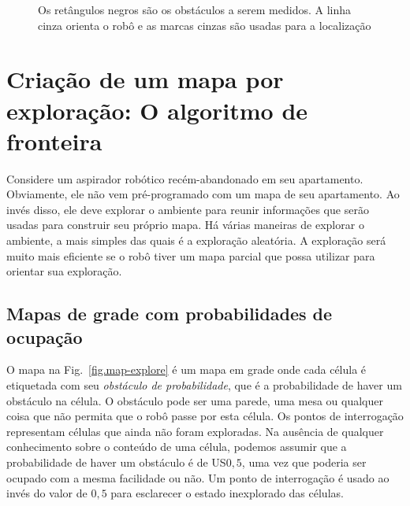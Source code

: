 \begin{figure}
\begin{center}
\end{center}
\caption{Os retângulos negros são os obstáculos a serem medidos. A linha cinza orienta o robô e as marcas cinzas são usadas para a localização}\label{fig.mapping-activity}
\end{figure}

\section{Criação de um mapa por exploração: O algoritmo de fronteira}\label{s.map-create}

Considere um aspirador robótico recém-abandonado em seu apartamento. Obviamente, ele não vem pré-programado com um mapa de seu apartamento. Ao invés disso, ele deve explorar o ambiente para reunir informações que serão usadas para construir seu próprio mapa. Há várias maneiras de explorar o ambiente, a mais simples das quais é a exploração aleatória. A exploração será muito mais eficiente se o robô tiver um mapa parcial que possa utilizar para orientar sua exploração.

\subsection{Mapas de grade com probabilidades de ocupação}

O mapa na Fig.~\ref{fig.map-explore} é um mapa em grade onde cada célula é etiquetada com seu \emph{obstáculo de probabilidade}, que é a probabilidade de haver um obstáculo na célula. O obstáculo pode ser uma parede, uma mesa ou qualquer coisa que não permita que o robô passe por esta célula. Os pontos de interrogação representam células que ainda não foram exploradas. Na ausência de qualquer conhecimento sobre o conteúdo de uma célula, podemos assumir que a probabilidade de haver um obstáculo é de US$ 0,5$, uma vez que poderia ser ocupado com a mesma facilidade ou não. Um ponto de interrogação é usado ao invés do valor de $0,5$ para esclarecer o estado inexplorado das células.

